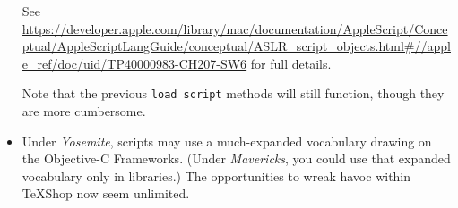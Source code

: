 \documentclass[11pt]{amsart}
\def\TeXShop{\TeX Shop\xspace}
\begin{document}
\begin{itemize}
See  \url{https://developer.apple.com/library/mac/documentation/AppleScript/Conceptual/AppleScriptLangGuide/conceptual/ASLR_script_objects.html#//apple_ref/doc/uid/TP40000983-CH207-SW6} for full details.

Note that the previous {\tt load script} methods will still function, though they are more cumbersome.
\item Under \emph{Yosemite}, scripts may use a much-expanded vocabulary drawing on the Objective-C Frameworks. (Under \emph{Mavericks}, you could use that expanded vocabulary only in libraries.) The opportunities to wreak havoc within \TeXShop now seem unlimited.

\end{itemize}
\end{document}

